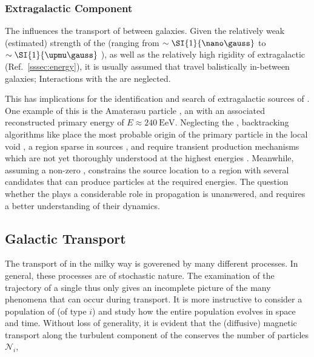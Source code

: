 \subsubsection{Extragalactic Component}

The \EGMF influences the transport of \CRs between galaxies. Given the 
relatively weak (estimated) strength of the \EGMF (ranging from 
$\sim\SI{1}{\nano\gauss}$ \cite{brayUpperLimitStrength2018} to 
$\sim\SI{1}{\upmu\gauss}$ \cite{valleeDetectingLargestMagnets1990}), as well as
the relatively high rigidity of extragalactic \CRs (Ref.\ \cref{sssec:energy}),
it is usually assumed that \CRs travel balistically in-between galaxies;
Interactions with the \EGMF are neglected. 

This has implications for the identification and search of extragalactic 
sources of \UHECRs. One example of this is the Amaterasu particle
\cite{telescopearraycollaborationExtremelyEnergeticCosmic2023}, an \EAS with an
associated reconstructed primary energy of $E\approx\SI{240}{\exa\eV}$. 
Neglecting the \EGMF, backtracking algorithms like 
\cite{batistaCRPropa32Advanced2022} place the most probable origin of the 
primary particle in the local void \cite{ungerWhereDidAmaterasu2024}, a region 
sparse in \UHECR sources \cite{tullyNearbyGalaxiesCatalog1988}, and require 
transient production mechanisms which are not yet thoroughly understood at the 
highest energies \cite{farrarBinaryNeutronStar2025}. Meanwhile, assuming a 
non-zero \EGMF, \cite{bourricheLocalVoidComprehensive2024} constrains the source location to 
a region with several candidates that can produce particles at the required
energies. The question whether the \EGMF plays a considerable role in \CR 
propagation is unanswered, and requires a better understanding of their 
dynamics.

\subsection{Galactic Transport}
\label{ssec:galactic-transport}

The transport of \CRs in the milky way is goverened by many different 
processes. In general, these processes are of stochastic nature. The 
examination of the trajectory of a single \CR thus only gives an incomplete 
picture of the many phenomena that can occur during transport. It is more 
instructive to consider a population of \CRs (of type $i$) and study how the 
entire population evolves in space and time. Without loss of generality, it is 
evident that the (diffusive) magnetic transport along the turbulent component 
of the \GMF conserves the number of particles $\mathcal{N}_i$,

